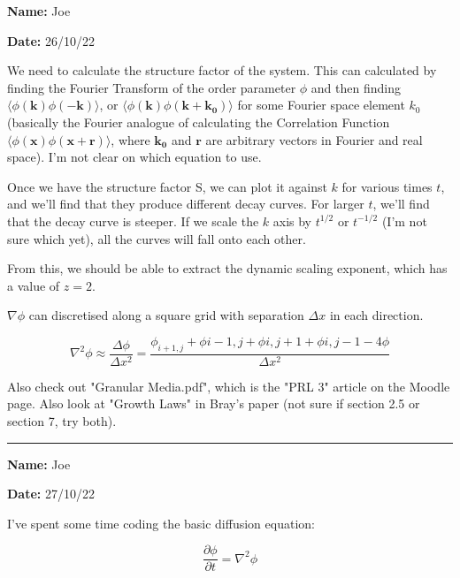 \documentclass{article}
\begin{document}
\textbf{Name:} Joe

\textbf{Date:} 26/10/22

\bigskip

We need to calculate the structure factor of the system. This can calculated by finding the Fourier Transform of the order parameter $\phi$ and then finding $\langle \phi(\boldsymbol{k})\phi(\boldsymbol{-k})\rangle$, or $\langle \phi(\boldsymbol{k})\phi(\boldsymbol{k}+\boldsymbol{k_{0}})\rangle$ for some Fourier space element $k_{0}$ (basically the Fourier analogue of calculating the Correlation Function $\langle\phi(\boldsymbol{x})\phi(\boldsymbol{x}+\boldsymbol{r})\rangle$, where $\boldsymbol{k_{0}}$ and $\boldsymbol{r}$ are arbitrary vectors in Fourier and real space). I'm not clear on which equation to use.

\medskip

Once we have the structure factor S, we can plot it against $k$ for various times $t$, and we'll find that they produce different decay curves. For larger $t$, we'll find that the decay curve is steeper. If we scale the $k$ axis by $t^{1/2}$ or $t^{-1/2}$ (I'm not sure which yet), all the curves will fall onto each other.



From this, we should be able to extract the dynamic scaling exponent, which has a value of $z=2$.

\medskip

$\nabla\phi$ can discretised along a square grid with separation $\Delta x$ in each direction.

\begin{equation}\label{discretized laplacian}
	\nabla^2 \phi \approx \frac{\Delta \phi}{\Delta x^{2}} = \frac{\phi_{i+1,j} + \phi{i-1,j} + \phi{i,j+1} + \phi{i,j-1}-4\phi}{\Delta x^{2}}
\end{equation}

\medskip

Also check out "Granular Media.pdf", which is the "PRL 3" article on the Moodle page. Also look at "Growth Laws" in Bray's paper (not sure if section 2.5 or section 7, try both).

\medskip

\rule{\textwidth}{0.4pt}

\textbf{Name:} Joe

\textbf{Date:} 27/10/22

\bigskip

I've spent some time coding the basic diffusion equation:

\begin{equation}\label{diffusion equation}
	\frac{\partial \phi}{\partial t} = \nabla^{2} \phi
\end{equation}
\end{document}

